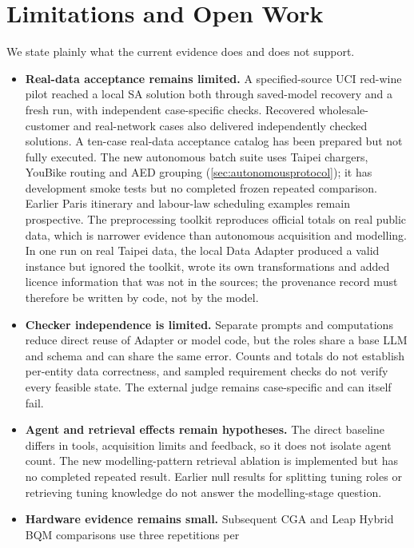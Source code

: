\section{Limitations and Open Work}
\label{sec:limitations}

We state plainly what the current evidence does and does not support.

\begin{itemize}
  \item \textbf{Real-data acceptance remains limited.} A specified-source UCI red-wine pilot reached a local SA
        solution both through saved-model recovery and a fresh run, with independent case-specific checks.
        Recovered wholesale-customer and real-network cases also delivered independently checked solutions.
        A ten-case real-data acceptance catalog has been prepared but not fully executed. The new autonomous
        batch suite uses Taipei chargers, YouBike routing and AED grouping (\cref{sec:autonomousprotocol});
        it has development smoke tests but no completed frozen repeated comparison. Earlier Paris itinerary
        and labour-law scheduling examples remain prospective. The preprocessing toolkit reproduces official
        totals on real public data, which is narrower evidence than autonomous acquisition and modelling. In one run on real Taipei data, the local Data Adapter produced a valid instance but
        ignored the toolkit, wrote its own transformations and added licence information that was not in the
        sources; the provenance record must therefore be written by code, not by the model.
  \item \textbf{Checker independence is limited.} Separate prompts and computations reduce direct reuse of
        Adapter or model code, but the roles share a base LLM and schema and can share the same error.
        Counts and totals do not establish per-entity data correctness, and sampled requirement checks do not
        verify every feasible state. The external judge remains case-specific and can itself fail.
  \item \textbf{Agent and retrieval effects remain hypotheses.} The direct baseline differs in tools,
        acquisition limits and feedback, so it does not isolate agent count. The new modelling-pattern
        retrieval ablation is implemented but has no completed repeated result. Earlier null results for
        splitting tuning roles or retrieving tuning knowledge do not answer the modelling-stage question.
  \item \textbf{Hardware evidence remains small.} Subsequent CGA and Leap Hybrid BQM comparisons use three repetitions per

\end{itemize}
